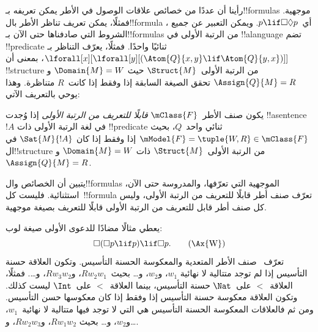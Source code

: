 \documentclass[../../../include/open-logic-section]{subfiles}
\begin{document}


رأينا أن عددًا من خصائص علاقات الوصول في الأطر يمكن تعريفه
بـ!!{formula}s موجهية. فمثلًا، يمكن تعريف تناظر الأطر بال!!{formula}
، أي~$p \lif \Box\Diamond p$. ويمكن التعبير عن جميع الشروط التي
صادفناها حتى الآن بـ!!{formula}s من الرتبة الأولى في !!a{language}
تضم !!{predicate} ثنائيًا واحدًا. فمثلًا، يعرّف التناظر بـ
$\lforall[x][\lforall[y][(\Atom{Q}{x,y} \lif \Atom{Q}{y, x})]]$،
بمعنى أن !!{structure} من الرتبة الأولى~$\Struct{M}$ حيث
$\Domain{M} = W$ و$\Assign{Q}{M} = R$ تحقق الصيغة السابقة إذا وفقط
إذا كانت~$R$ متناظرة. وهذا يوحي بالتعريف الآتي:

\begin{defn}
  يكون صنف الأطر~$\mClass{F}$ \emph{قابلًا للتعريف من الرتبة الأولى}
  إذا وُجدت !!a{sentence}~$!A$ في لغة الرتبة الأولى ذات
  !!{predicate} ثنائي واحد~$Q$، بحيث
  $\mModel{F} = \tuple{W, R} \in \mClass{F}$ إذا وفقط إذا كان
  $\Sat{M}{!A}$ في ال!!{structure} من الرتبة الأولى~$\Struct{M}$ ذات
  $\Domain{M} = W$ و$\Assign{Q}{M} = R$.
\end{defn}

يتبين أن الخصائص وال!!{formula}s الموجهية التي تعرّفها، والمدروسة حتى
الآن، استثنائية. فليست كل~!!{formula} تعرّف صنف أطر قابلًا للتعريف من
الرتبة الأولى، وليس كل صنف أطر قابل للتعريف من الرتبة الأولى قابلًا
للتعريف بصيغة موجهية.

يعطي مثالًا مضادًا للدعوى الأولى صيغة لوب:
\begin{equation}
\Box(\Box p \lif p) \lif \Box p. \tag{\Ax{W}}
\end{equation}
تعرّف~ صنف الأطر المتعدية والمعكوسة الحسنة التأسيس. وتكون
العلاقة حسنة التأسيس إذا لم توجد متتالية لا نهائية
$w_1$، و$w_2$، و\dots{} بحيث~$Rw_2w_1$، و$Rw_3w_2$، و\dots. فمثلًا،
العلاقة~$<$ على~$\Nat$ حسنة التأسيس، بينما العلاقة~$<$ على~$\Int$
ليست كذلك. وتكون العلاقة معكوسة حسنة التأسيس إذا وفقط إذا كان
معكوسها حسن التأسيس. ومن ثم فالعلاقات المعكوسة الحسنة التأسيس هي التي
لا توجد فيها متتالية لا نهائية~$w_1$، و$w_2$، و\dots{} بحيث
$Rw_1w_2$، و$Rw_2w_3$، و\dots.
\end{document}

